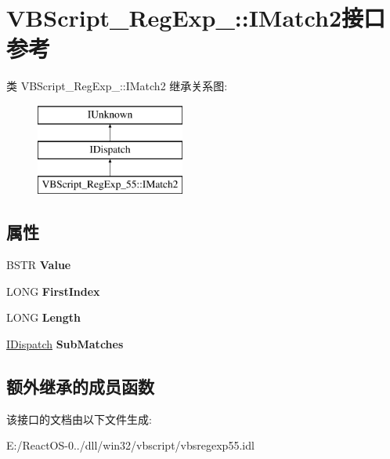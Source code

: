 \hypertarget{interface_v_b_script___reg_exp__55_1_1_i_match2}{}\section{V\+B\+Script\+\_\+\+Reg\+Exp\+\_\+:\+:I\+Match2接口 参考}
\label{interface_v_b_script___reg_exp__55_1_1_i_match2}
类 V\+B\+Script\+\_\+\+Reg\+Exp\+\_\+:\+:I\+Match2 继承关系图\+:\begin{figure}[H]
\begin{center}
\leavevmode
\includegraphics[height=3.000000cm]{interface_v_b_script___reg_exp__55_1_1_i_match2}
\end{center}
\end{figure}
\subsection*{属性}
\begin{DoxyCompactItemize}
\item 
\mbox{\label{interface_v_b_script___reg_exp__55_1_1_i_match2_a05b6ef0b328e2b1d09a8e25ffd1cfac1}} 
B\+S\+TR {\bfseries Value}
\item 
\mbox{\label{interface_v_b_script___reg_exp__55_1_1_i_match2_aa40c7fd88cfa3f251e3b6860aad04f6d}} 
L\+O\+NG {\bfseries First\+Index}
\item 
\mbox{\label{interface_v_b_script___reg_exp__55_1_1_i_match2_ac15345ec7ee8a1054aaa4d7f29ccbc09}} 
L\+O\+NG {\bfseries Length}
\item 
\mbox{\label{interface_v_b_script___reg_exp__55_1_1_i_match2_adfd477ec3f7f2e9041753de1d82aca6a}} 
\hyperlink{interface_i_dispatch}{I\+Dispatch} {\bfseries Sub\+Matches}
\end{DoxyCompactItemize}
\subsection*{额外继承的成员函数}


该接口的文档由以下文件生成\+:\begin{DoxyCompactItemize}
\item 
E\+:/\+React\+O\+S-\/0../dll/win32/vbscript/vbsregexp55.\+idl\end{DoxyCompactItemize}

